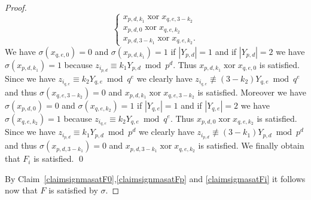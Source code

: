 \documentclass{article}
\DeclareMathOperator{\xor}{xor}
\begin{document}
\begin{proof}
\begin{displaymath}
\begin{cases}
x_{p,d,k_1} \xor x_{q,e,3-k_2}\\
x_{p,d,0} \xor x_{q,e,k_2}\\
x_{p,d,3-k_1} \xor x_{q,e,k_2}.
\end{cases}
\end{displaymath}
We have $\sigma(x_{q,e,0}) = 0$ and $\sigma(x_{p,d,k_1}) = 1$ if $|Y_{p,d}| = 1$ and if $|Y_{p,d}| = 2$ we have $\sigma(x_{p,d,k_1}) = 1$ because $z_{i_{p,d}} \equiv k_1Y_{p,d} \bmod p^d$. Thus $x_{p,d,k_1} \xor x_{q,e,0}$ is satisfied. Since we have $z_{i_{q,e}} \equiv k_2Y_{q,e} \bmod q^e$ we clearly have $z_{i_{q,e}} \not \equiv (3-k_2)Y_{q,e} \bmod q^e$ and thus $\sigma(x_{q,e,3-k_2}) = 0$ and $x_{p,d,k_1} \xor x_{q,e,3-k_2}$ is satisfied. Moreover we have $\sigma(x_{p,d,0}) = 0$ and $\sigma(x_{q,e,k_2}) = 1$ if $|Y_{q,e}| = 1$ and if $|Y_{q,e}| = 2$ we have $\sigma(x_{q,e,k_2}) = 1$ because $z_{i_{q,e}} \equiv k_2Y_{q,e} \bmod q^e$. Thus $x_{p,d,0} \xor x_{q,e,k_2}$ is satisfied. Since we have $z_{i_{p,d}} \equiv k_1Y_{p,d} \bmod p^d$ we clearly have $z_{i_{p,d}} \not \equiv (3-k_1)Y_{p,d} \bmod p^d$ and thus $\sigma(x_{p,d,3-k_1}) = 0$ and $x_{p,d,3-k_1} \xor x_{q,e,k_2}$ is satisfied. We finally obtain that $F_i$ is satisfied.
\qed

By Claim~\ref{claimsignmasatF0},\ref{claimsignmasatFp} and \ref{claimsigmasatFi} it follows now that $F$ is satisfied by $\sigma$.


\end{proof}
\end{document}
